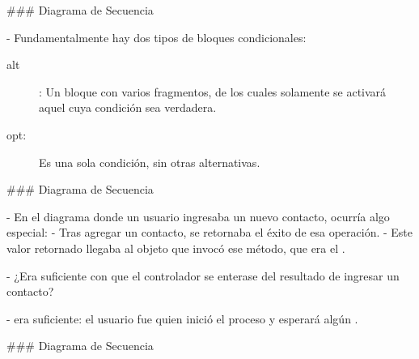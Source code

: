 ### Diagrama de Secuencia


- Fundamentalmente hay dos tipos de bloques condicionales:

\begin{description}
    \item[alt]: Un bloque con varios fragmentos, de los cuales solamente se activará aquel cuya
    condición sea verdadera.
    \item[opt:] Es una sola condición, sin otras alternativas.
\end{description}

### Diagrama de Secuencia


\newline

- En el diagrama donde un usuario ingresaba un nuevo contacto, ocurría algo especial:
    - Tras agregar un contacto, se retornaba el éxito de esa operación.
    - Este valor retornado llegaba al objeto que invocó ese método, que era el .

\vfill

- ¿Era suficiente con que el controlador se enterase del resultado de ingresar un contacto?

\pause

\buildrboxx{}

-  era suficiente: el usuario fue quien inició el proceso y esperará algún .

\finishrboxx

### Diagrama de Secuencia


